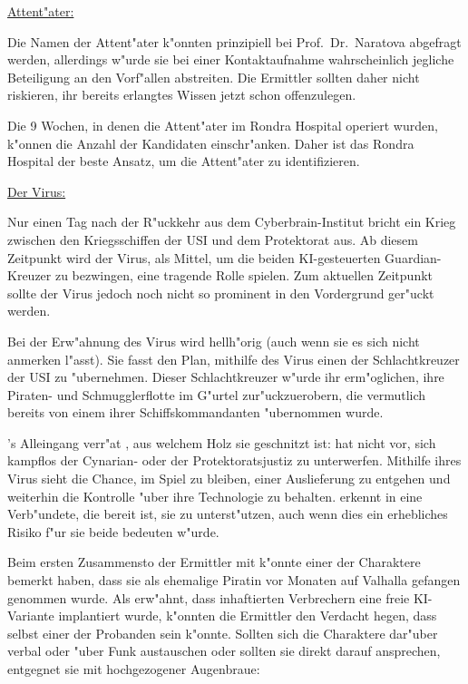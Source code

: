 \begin{remarks}
	\underline{Attent"ater:}

	Die Namen der Attent"ater k"onnten prinzipiell bei Prof.~Dr.~Naratova abgefragt werden, allerdings w"urde sie bei einer Kontaktaufnahme wahrscheinlich jegliche Beteiligung an den Vorf"allen abstreiten. Die Ermittler sollten daher nicht riskieren, ihr bereits erlangtes Wissen jetzt schon offenzulegen.

	Die 9 Wochen, in denen die Attent"ater im Rondra Hospital operiert wurden, k"onnen die Anzahl der Kandidaten einschr"anken. Daher ist das Rondra Hospital der beste Ansatz, um die Attent"ater zu identifizieren.	

	\underline{Der Virus:}

	Nur einen Tag nach der R"uckkehr aus dem Cyberbrain-Institut bricht ein Krieg zwischen den Kriegsschiffen der USI und dem Protektorat aus. Ab diesem Zeitpunkt wird der Virus, als Mittel, um die beiden KI-gesteuerten Guardian-Kreuzer zu bezwingen, eine tragende Rolle spielen. Zum aktuellen Zeitpunkt sollte der Virus jedoch noch nicht so prominent in den Vordergrund ger"uckt werden.
\end{remarks}

Bei der Erw"ahnung des Virus wird \xl{} hellh"orig (auch wenn sie es sich nicht anmerken l"asst). Sie fasst den Plan, mithilfe des Virus einen der Schlachtkreuzer der USI zu "ubernehmen. Dieser Schlachtkreuzer w"urde ihr erm"oglichen, ihre Piraten- und Schmugglerflotte im G"urtel zur"uckzuerobern, die vermutlich bereits von einem ihrer Schiffskommandanten "ubernommen wurde.

\ml{}’s Alleingang verr"at \xl{}, aus welchem Holz sie geschnitzt ist: \ml{} hat nicht vor, sich kampflos der Cynarian- oder der Protektoratsjustiz zu unterwerfen. Mithilfe ihres Virus sieht \ml{} die Chance, im Spiel zu bleiben, einer Auslieferung zu entgehen und weiterhin die Kontrolle "uber ihre Technologie zu behalten. \xl{} erkennt in \ml{} eine Verb"undete, die bereit ist, sie zu unterst"utzen, auch wenn dies ein erhebliches Risiko f"ur sie beide bedeuten w"urde.

Beim ersten Zusammensto\3 der Ermittler mit \xl{} k"onnte einer der Charaktere bemerkt haben, dass sie als ehemalige Piratin vor Monaten auf Valhalla gefangen genommen wurde. Als \ml{} erw"ahnt, dass inhaftierten Verbrechern eine freie KI-Variante implantiert wurde, k"onnten die Ermittler den Verdacht hegen, dass \xl{} selbst einer der Probanden sein k"onnte. Sollten sich die Charaktere dar"uber verbal oder "uber Funk austauschen oder sollten sie \xl{} direkt darauf ansprechen, entgegnet sie mit hochgezogener Augenbraue:

